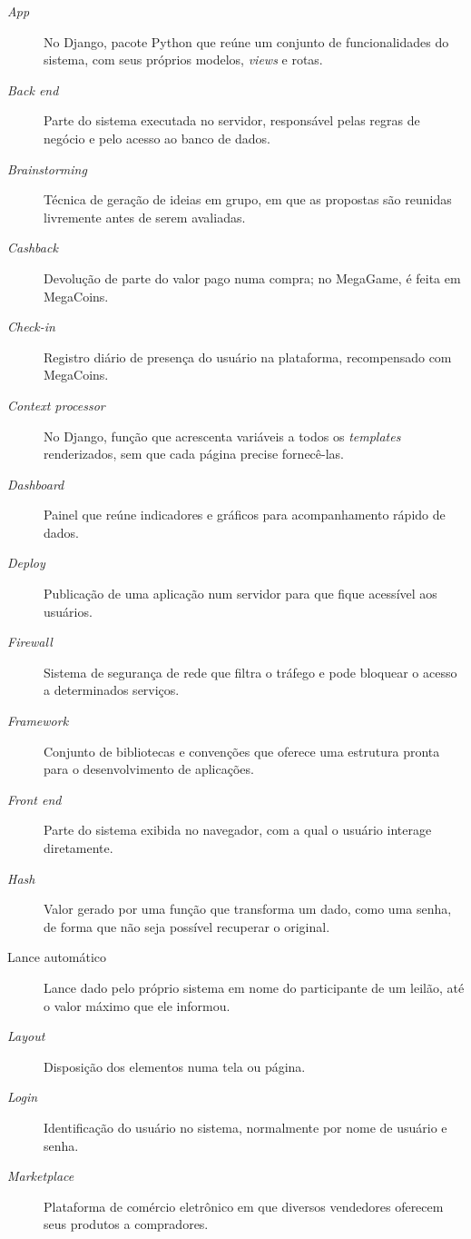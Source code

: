 \documentclass[
  12pt,
  a4paper,
  oneside,
  chapter=TITLE,
  subsection=TITLE,
  sumario=abnt-6027-2012,
  english,
  brazil
]{abntex2}
\begin{document}
\begin{description}
  \item[\emph{App}] No Django, pacote Python que reúne um conjunto de funcionalidades do sistema, com seus próprios modelos, \emph{views} e rotas.
  \item[\emph{Back end}] Parte do sistema executada no servidor, responsável pelas regras de negócio e pelo acesso ao banco de dados.
  \item[\emph{Brainstorming}] Técnica de geração de ideias em grupo, em que as propostas são reunidas livremente antes de serem avaliadas.
  \item[\emph{Cashback}] Devolução de parte do valor pago numa compra; no MegaGame, é feita em MegaCoins.
  \item[\emph{Check-in}] Registro diário de presença do usuário na plataforma, recompensado com MegaCoins.
  \item[\emph{Context processor}] No Django, função que acrescenta variáveis a todos os \emph{templates} renderizados, sem que cada página precise fornecê-las.
  \item[\emph{Dashboard}] Painel que reúne indicadores e gráficos para acompanhamento rápido de dados.
  \item[\emph{Deploy}] Publicação de uma aplicação num servidor para que fique acessível aos usuários.
  \item[\emph{Firewall}] Sistema de segurança de rede que filtra o tráfego e pode bloquear o acesso a determinados serviços.
  \item[\emph{Framework}] Conjunto de bibliotecas e convenções que oferece uma estrutura pronta para o desenvolvimento de aplicações.
  \item[\emph{Front end}] Parte do sistema exibida no navegador, com a qual o usuário interage diretamente.
  \item[\emph{Hash}] Valor gerado por uma função que transforma um dado, como uma senha, de forma que não seja possível recuperar o original.
  \item[Lance automático] Lance dado pelo próprio sistema em nome do participante de um leilão, até o valor máximo que ele informou.
  \item[\emph{Layout}] Disposição dos elementos numa tela ou página.
  \item[\emph{Login}] Identificação do usuário no sistema, normalmente por nome de usuário e senha.
  \item[\emph{Marketplace}] Plataforma de comércio eletrônico em que diversos vendedores oferecem seus produtos a compradores.

\end{description}
\end{document}
